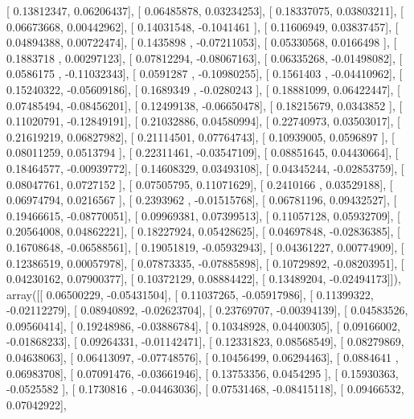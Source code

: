 \documentclass{article}
\begin{document}
       [ 0.13812347,  0.06206437],
       [ 0.06485878,  0.03234253],
       [ 0.18337075,  0.03803211],
       [ 0.06673668,  0.00442962],
       [ 0.14031548, -0.1041461 ],
       [ 0.11606949,  0.03837457],
       [ 0.04894388,  0.00722474],
       [ 0.1435898 , -0.07211053],
       [ 0.05330568,  0.0166498 ],
       [ 0.1883718 ,  0.00297123],
       [ 0.07812294, -0.08067163],
       [ 0.06335268, -0.01498082],
       [ 0.0586175 , -0.11032343],
       [ 0.0591287 , -0.10980255],
       [ 0.1561403 , -0.04410962],
       [ 0.15240322, -0.05609186],
       [ 0.1689349 , -0.0280243 ],
       [ 0.18881099,  0.06422447],
       [ 0.07485494, -0.08456201],
       [ 0.12499138, -0.06650478],
       [ 0.18215679,  0.0343852 ],
       [ 0.11020791, -0.12849191],
       [ 0.21032886,  0.04580994],
       [ 0.22740973,  0.03503017],
       [ 0.21619219,  0.06827982],
       [ 0.21114501,  0.07764743],
       [ 0.10939005,  0.0596897 ],
       [ 0.08011259,  0.0513794 ],
       [ 0.22311461, -0.03547109],
       [ 0.08851645,  0.04430664],
       [ 0.18464577, -0.00939772],
       [ 0.14608329,  0.03493108],
       [ 0.04345244, -0.02853759],
       [ 0.08047761,  0.0727152 ],
       [ 0.07505795,  0.11071629],
       [ 0.2410166 ,  0.03529188],
       [ 0.06974794,  0.0216567 ],
       [ 0.2393962 , -0.01515768],
       [ 0.06781196,  0.09432527],
       [ 0.19466615, -0.08770051],
       [ 0.09969381,  0.07399513],
       [ 0.11057128,  0.05932709],
       [ 0.20564008,  0.04862221],
       [ 0.18227924,  0.05428625],
       [ 0.04697848, -0.02836385],
       [ 0.16708648, -0.06588561],
       [ 0.19051819, -0.05932943],
       [ 0.04361227,  0.00774909],
       [ 0.12386519,  0.00057978],
       [ 0.07873335, -0.07885898],
       [ 0.10729892, -0.08203951],
       [ 0.04230162,  0.07900377],
       [ 0.10372129,  0.08884422],
       [ 0.13489204, -0.02494173]]), array([[ 0.06500229, -0.05431504],
       [ 0.11037265, -0.05917986],
       [ 0.11399322, -0.02112279],
       [ 0.08940892, -0.02623704],
       [ 0.23769707, -0.00394139],
       [ 0.04583526,  0.09560414],
       [ 0.19248986, -0.03886784],
       [ 0.10348928,  0.04400305],
       [ 0.09166002, -0.01868233],
       [ 0.09264331, -0.01142471],
       [ 0.12331823,  0.08568549],
       [ 0.08279869,  0.04638063],
       [ 0.06413097, -0.07748576],
       [ 0.10456499,  0.06294463],
       [ 0.0884641 ,  0.06983708],
       [ 0.07091476, -0.03661946],
       [ 0.13753356,  0.0454295 ],
       [ 0.15930363, -0.0525582 ],
       [ 0.1730816 , -0.04463036],
       [ 0.07531468, -0.08415118],
       [ 0.09466532,  0.07042922],
\end{document}
